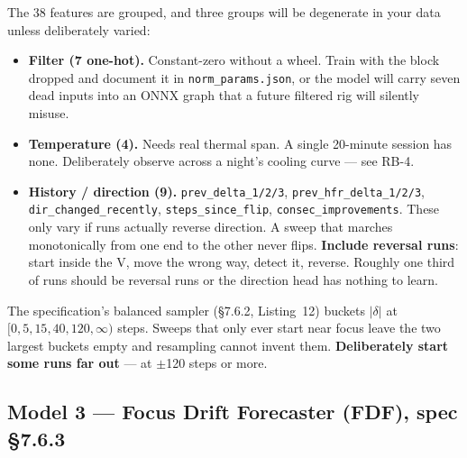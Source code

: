 \documentclass[11pt]{article}
\newcommand{\co}[1]{\texttt{\small #1}}
\begin{document}
The 38 features are grouped, and three groups will be degenerate in your data
unless deliberately varied:

\begin{itemize}
\item \textbf{Filter (7 one-hot).} Constant-zero without a wheel. Train with the
      block dropped and document it in \co{norm\_params.json}, or the model
      will carry seven dead inputs into an ONNX graph that a future
      filtered rig will silently misuse.
\item \textbf{Temperature (4).} Needs real thermal span. A single 20-minute
      session has none. Deliberately observe across a night's cooling curve ---
      see RB-4.
\item \textbf{History / direction (9).} \co{prev\_delta\_1/2/3},
      \co{prev\_hfr\_delta\_1/2/3}, \co{dir\_changed\_recently},
      \co{steps\_since\_flip}, \co{consec\_improvements}. These only vary if
      runs actually reverse direction. A sweep that marches monotonically from
      one end to the other never flips. \textbf{Include reversal runs}: start
      inside the V, move the wrong way, detect it, reverse. Roughly one third of
      runs should be reversal runs or the direction head has nothing to learn.
\end{itemize}

The specification's balanced sampler (\S7.6.2, Listing~12) buckets
$|\delta|$ at $[0,5,15,40,120,\infty)$ steps. Sweeps that only ever start near
focus leave the two largest buckets empty and resampling cannot invent them.
\textbf{Deliberately start some runs far out} --- at $\pm$120 steps or more.

\subsection{Model 3 --- Focus Drift Forecaster (FDF), spec \S7.6.3}\label{m:fdf}
\end{document}
